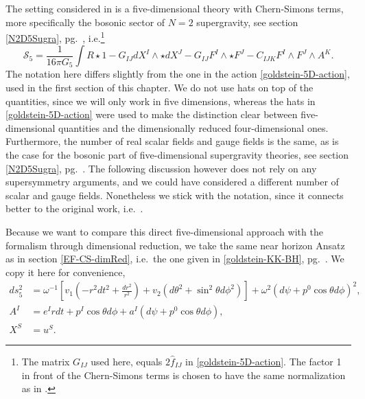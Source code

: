 \documentclass[12pt,twoside]{book}
\begin{document}
The setting considered in \cite{Arsiwalla:2008gc} is a five-dimensional theory with Chern-Simons terms, more specifically the bosonic sector of $N=2$ supergravity, see section \ref{N2D5Sugra}, pg.\ \pageref{N2D5Sugra}, i.e.\footnote{
The matrix $G_{IJ}$ used here, equals $2\hat{f}_{IJ}$ in \eqref{goldstein-5D-action}. The factor 1 in front of the Chern-Simons terms is chosen to have the same normalization as in \cite{Arsiwalla:2008gc}.
}
\begin{equation}\label{eq:actionN2D5-bis}
\mathcal{S}_{5} = \frac{1}{16\pi G_{5}} \int R\star 1 - G_{IJ}dX^{I}\wedge\star dX^{J} - G_{IJ}F^{I}\wedge\star F^{J}-
C_{IJK}F^{I}\wedge F^{J}\wedge A^{K}.
\end{equation}
The notation here differs slightly from the one in the action \eqref{goldstein-5D-action}, used in the first section of this chapter. We do not use hats on top of the quantities, since we will only work in five dimensions, whereas the hats in \eqref{goldstein-5D-action} were used to make the distinction clear between five-dimensional quantities and the dimensionally reduced four-dimensional ones. Furthermore, the number of real scalar fields and gauge fields is the same, as is the case for the bosonic part of five-dimensional supergravity theories, see section \eqref{N2D5Sugra}, pg.\ \pageref{N2D5Sugra}. The following discussion however does not rely on any supersymmetry arguments, and we could have considered a different number of scalar and gauge fields. Nonetheless we stick with the notation, since it connects better to the original work, i.e.\ \cite{Arsiwalla:2008gc}.

Because we want to compare this direct five-dimensional approach with the formalism through dimensional reduction, we take the same near horizon Ansatz as in section \ref{EF-CS-dimRed}, i.e.\ the one given in \eqref{goldstein-KK-BH}, pg.\ \pageref{goldstein-KK-BH}. We copy it here for convenience,
\begin{equation}\label{arsiwalla-BH}
\begin{split}
ds_{5}^{2} &= \omega^{-1} \left[ v_{1}\left( -r^{2}dt^{2} + \frac{dr^{2}}{r^{2}} \right) + v_{2} (d\theta^{2} + \sin^{2}\theta d\phi^{2}) \right]
+ \omega^{2} (d\psi + p^{0}\cos\theta d\phi)^{2}, \\
A^{I} &= e^{I}rdt + p^{I}\cos\theta d\phi + a^{I} (d\psi + p^{0}\cos\theta d\phi), \\
X^{S} &= u^{S}.
\end{split}
\end{equation}
\end{document}
